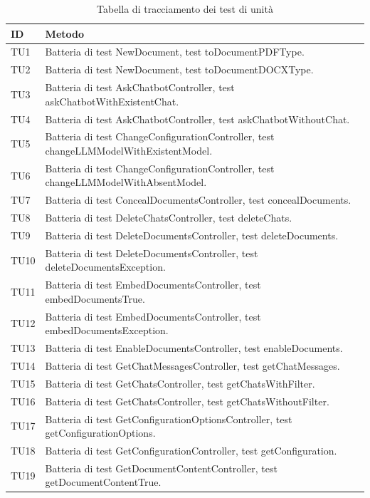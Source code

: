 \documentclass[10pt, a4paper]{article}
\begin{document}
\begin{xltabular}{\textwidth}{p{0.12\textwidth}|X}
\caption{Tabella di tracciamento dei test di unità}
\label{tab:test_tracciamento_test_unità}\\
\textbf{ID} & \textbf{Metodo} \\
\hline
TU1 & Batteria di test NewDocument, test toDocumentPDFType. \\
\hline
TU2 & Batteria di test NewDocument, test toDocumentDOCXType. \\
\hline
TU3 & Batteria di test AskChatbotController, test askChatbotWithExistentChat. \\
\hline
TU4 & Batteria di test AskChatbotController, test askChatbotWithoutChat. \\
\hline
TU5 & Batteria di test ChangeConfigurationController, test changeLLMModelWithExistentModel. \\
\hline
TU6 & Batteria di test ChangeConfigurationController, test changeLLMModelWithAbsentModel. \\
\hline
TU7 & Batteria di test ConcealDocumentsController, test concealDocuments. \\
\hline
TU8 & Batteria di test DeleteChatsController, test deleteChats. \\
\hline
TU9 & Batteria di test DeleteDocumentsController, test deleteDocuments. \\
\hline
TU10 & Batteria di test DeleteDocumentsController, test deleteDocumentsException. \\
\hline
TU11 & Batteria di test EmbedDocumentsController, test embedDocumentsTrue. \\
\hline
TU12 & Batteria di test EmbedDocumentsController, test embedDocumentsException. \\
\hline
TU13 & Batteria di test EnableDocumentsController, test enableDocuments. \\
\hline
TU14 & Batteria di test GetChatMessagesController, test getChatMessages. \\
\hline
TU15 & Batteria di test GetChatsController, test getChatsWithFilter. \\
\hline
TU16 & Batteria di test GetChatsController, test getChatsWithoutFilter. \\
\hline
TU17 & Batteria di test GetConfigurationOptionsController, test getConfigurationOptions. \\
\hline
TU18 & Batteria di test GetConfigurationController, test getConfiguration. \\
\hline
TU19 & Batteria di test GetDocumentContentController, test getDocumentContentTrue. \\

\end{xltabular}
\end{document}

